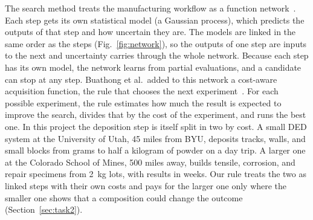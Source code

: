 \documentclass[12pt,letterpaper]{article}
\begin{document}
The search method treats the manufacturing workflow as a function
network~\cite{astudillo2021}. Each step gets its own statistical model (a
Gaussian process), which predicts the outputs of that step and how uncertain
they are. The models are linked in the same order as the steps
(Fig.~\ref{fig:network}), so the outputs of one step are inputs to the next
and uncertainty carries through the whole network. Because each step has its
own model, the network learns from partial evaluations, and a candidate can
stop at any step. Buathong et al.\ added to this network a cost-aware
acquisition function, the rule that chooses the next
experiment~\cite{buathong2024}. For each possible experiment, the rule
estimates how much the result is expected to improve the search, divides that
by the cost of the experiment, and runs the best one. In this project the
deposition step is itself split in two by cost. A small DED system at the
University of Utah, 45 miles from BYU, deposits tracks, walls, and small
blocks from grams to half a kilogram of powder on a day trip. A larger one at
the Colorado School of Mines, 500 miles away, builds tensile, corrosion, and
repair specimens from 2~kg lots, with results in weeks. Our rule treats the
two as linked steps with their own costs and pays for the larger one only
where the smaller one shows that a composition could change the outcome
(Section~\ref{sec:task2}).
\end{document}
